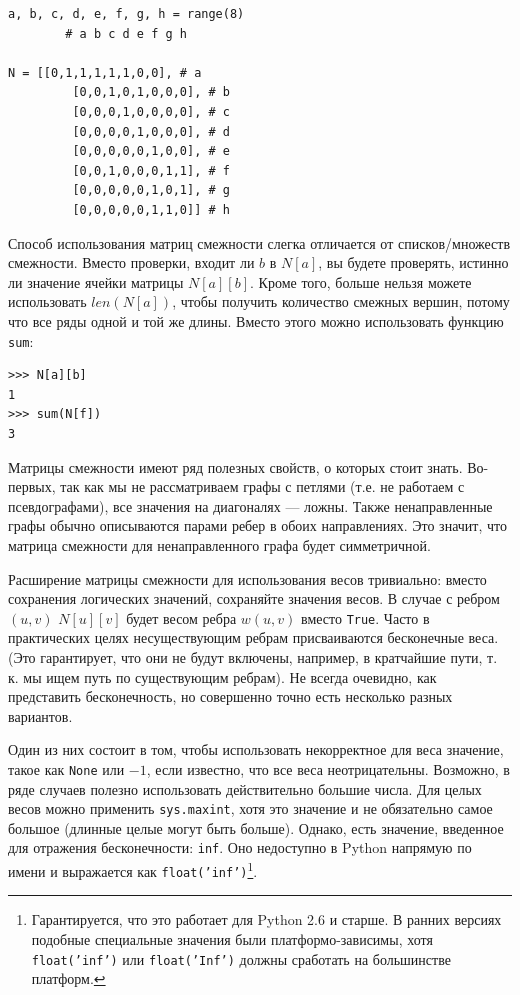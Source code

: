\begin{lstlisting}[caption={Матрица смежности, реализованная с помощью вложенных списков},label={lst:adjacency}]
a, b, c, d, e, f, g, h = range(8)
	    # a b c d e f g h

N = [[0,1,1,1,1,1,0,0], # a
		 [0,0,1,0,1,0,0,0], # b
		 [0,0,0,1,0,0,0,0], # c
		 [0,0,0,0,1,0,0,0], # d
		 [0,0,0,0,0,1,0,0], # e
		 [0,0,1,0,0,0,1,1], # f
		 [0,0,0,0,0,1,0,1], # g
		 [0,0,0,0,0,1,1,0]] # h
\end{lstlisting}

Способ использования матриц смежности слегка отличается от списков/множеств смежности. Вместо проверки, входит ли $b$ в $N[a]$, вы будете проверять, истинно ли значение ячейки матрицы $N[a][b]$. Кроме того, больше нельзя можете использовать $len(N[a])$, чтобы получить количество смежных вершин, потому что все ряды одной и той же длины. Вместо этого можно использовать функцию \texttt{sum}:
\begin{lstlisting}
>>> N[a][b]
1
>>> sum(N[f])
3
\end{lstlisting}

Матрицы смежности имеют ряд полезных свойств, о которых стоит знать. Во-первых, так как мы не рассматриваем графы с петлями (т.е. не работаем с псевдографами), все значения на диагоналях — ложны. Также ненаправленные графы обычно описываются парами ребер в обоих направлениях. Это значит, что матрица смежности для ненаправленного графа будет симметричной.

Расширение матрицы смежности для использования весов тривиально: вместо сохранения логических значений, сохраняйте значения весов. В случае с ребром $(u, v)$ $N[u][v]$ будет весом ребра $w(u,v)$ вместо \texttt{True}. Часто в практических целях несуществующим ребрам присваиваются бесконечные веса. (Это гарантирует, что они не будут включены, например, в кратчайшие пути, т. к. мы ищем путь по существующим ребрам). Не всегда очевидно, как представить бесконечность, но совершенно точно есть несколько разных вариантов.

Один из них состоит в том, чтобы использовать некорректное для веса значение, такое как \texttt{None} или $-1$, если известно, что все веса неотрицательны. Возможно, в ряде случаев полезно использовать действительно большие числа. Для целых весов можно применить \texttt{sys.maxint}, хотя это значение и не обязательно самое большое (длинные целые могут быть больше). Однако, есть значение, введенное для отражения бесконечности: \texttt{inf}. Оно недоступно в Python напрямую по имени и выражается как \texttt{float('inf')}\footnote{Гарантируется, что это работает для Python 2.6 и старше. В ранних версиях подобные специальные значения были платформо-зависимы, хотя \texttt{float('inf')} или \texttt{float('Inf')} должны сработать на большинстве платформ.}.

